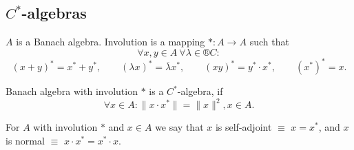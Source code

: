 \documentclass[12pt]{article}					%
\begin{document}
\subsection{\texorpdfstring{$C^*$}{C*}-algebras}
\begin{definice}[Involution]
	$A$ is a Banach algebra. Involution is a mapping $*: A \rightarrow A$ such that
	$$ \forall x, y \in A\ \forall λ \in ®C: $$
	$$ (x + y)^* = x^* + y^*, \qquad (λx)^* = \overline{λ} x^*, \qquad (xy)^* = y^*·x^*, \qquad (x^*)^* = x. $$
\end{definice}

\begin{definice}[$C^*$-algebra]
	Banach algebra with involution $*$ is a $C^*$-algebra, if
	$$ \forall x \in A: \|x·x^*\| = \|x\|^2, x \in A. $$
\end{definice}

\begin{definice}
	For $A$ with involution $*$ and $x \in A$ we say that $x$ is self-adjoint $≡$ $x = x^*$, and $x$ is normal $≡$ $x·x^* = x^*·x$.
\end{definice}
\end{document}

